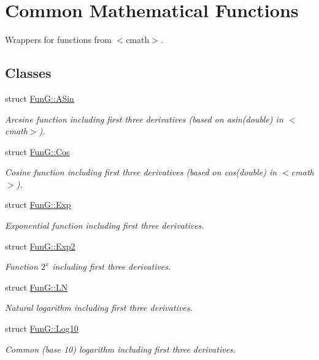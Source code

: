 \hypertarget{group__CMathGroup}{\section{Common Mathematical Functions}
\label{group__CMathGroup}
}


Wrappers for functions from $<$cmath$>$.  


\subsection*{Classes}
\begin{DoxyCompactItemize}
\item 
struct \hyperlink{structFunG_1_1ASin}{Fun\-G\-::\-A\-Sin}
\begin{DoxyCompactList}\small\item\em Arcsine function including first three derivatives (based on asin(double) in $<$cmath$>$). \end{DoxyCompactList}\item 
struct \hyperlink{structFunG_1_1Cos}{Fun\-G\-::\-Cos}
\begin{DoxyCompactList}\small\item\em Cosine function including first three derivatives (based on cos(double) in $<$cmath$>$). \end{DoxyCompactList}\item 
struct \hyperlink{structFunG_1_1Exp}{Fun\-G\-::\-Exp}
\begin{DoxyCompactList}\small\item\em Exponential function including first three derivatives. \end{DoxyCompactList}\item 
struct \hyperlink{structFunG_1_1Exp2}{Fun\-G\-::\-Exp2}
\begin{DoxyCompactList}\small\item\em Function $2^x$ including first three derivatives. \end{DoxyCompactList}\item 
struct \hyperlink{structFunG_1_1LN}{Fun\-G\-::\-L\-N}
\begin{DoxyCompactList}\small\item\em Natural logarithm including first three derivatives. \end{DoxyCompactList}\item 
struct \hyperlink{structFunG_1_1Log10}{Fun\-G\-::\-Log10}
\begin{DoxyCompactList}\small\item\em Common (base 10) logarithm including first three derivatives. \end{DoxyCompactList}\item 

\end{DoxyCompactItemize}
